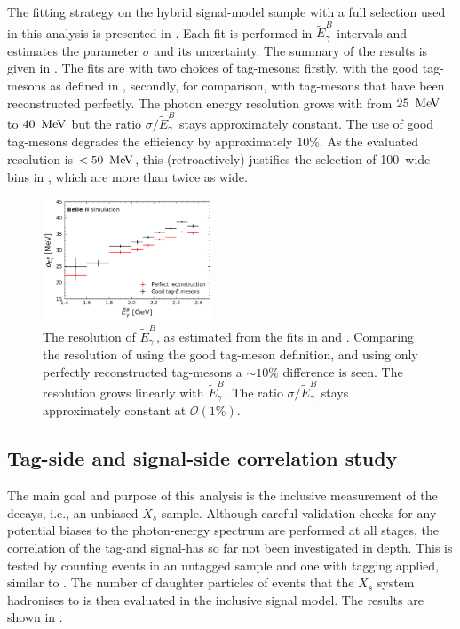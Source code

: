 The fitting strategy on the hybrid signal-model sample with a full selection used in this analysis is presented in .
Each fit is performed in $\tilde{E}_{\gamma}^{B}$ intervals and estimates the parameter $\sigma$ and its uncertainty.
The summary of the results is given in .
The fits are with two choices of tag-\B mesons: firstly, with the good tag-\B mesons as defined in ,
secondly, for comparison, with tag-\B mesons that have been reconstructed perfectly.
The photon energy resolution grows with \EB from $25~\mathrm{\,Me\kern -0.1em V}$ to $40~\mathrm{\,Me\kern -0.1em V}$
but the ratio $\sigma/\tilde{E}_{\gamma}^{B}$ stays approximately constant.
The use of good tag-\B mesons degrades the efficiency by approximately $10\%$.
As the evaluated resolution is $<50~\mathrm{\,Me\kern -0.1em V}$, this (retroactively) justifies the selection of 100~\mev wide bins in , which are more than twice as wide.

\begin{figure}[htbp!]
    \centering
    \includegraphics[width=0.45\textwidth]{figures/signal_validation/resolution_bin_by_bin_withkstar.pdf}
    \caption{\label{fig:resolution_sigmas} The resolution of $\tilde{E}_{\gamma}^{B}$, 
    as estimated from the fits in  and .
    Comparing the resolution of \EB using the good tag-\B meson definition, and using only perfectly reconstructed tag-\B mesons a $\sim10\%$ difference is seen.
    The resolution grows linearly with $\tilde{E}_{\gamma}^{B}$.
    The ratio $\sigma/\tilde{E}_{\gamma}^{B}$ stays approximately constant at $\mathcal{O}(1\%)$.
    }
\end{figure}

\subsection{Tag-side and signal-side correlation study}\label{sec:inclusivity_study}

The main goal and purpose of this analysis is the inclusive measurement of the \BtoXsgamma decays, i.e.,
an unbiased $X_s$ sample.
Although careful validation checks for any potential biases to the photon-energy spectrum are performed at all stages,
the correlation of the tag-\B and signal-\B has so far not been investigated in depth.
This is tested by counting \BtoXsgamma events in an untagged sample and one with \FEI tagging applied, similar to .
The number of daughter particles of events that the $X_s$ system hadronises to is then evaluated in the inclusive \BtoXsgamma signal model.
The results are shown in .

